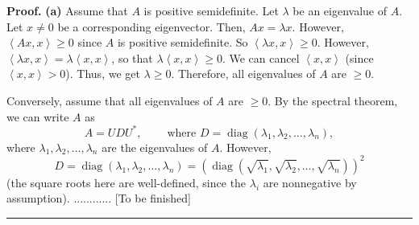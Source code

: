 \documentclass[numbers=enddot,12pt,final,onecolumn,notitlepage]{scrartcl}%
\numberwithin{exer}{subsection}
\theoremstyle{definition}
\newenvironment{proof}[1][Proof]{\noindent\textbf{#1.} }{\ \rule{0.5em}{0.5em}}
\begin{document}
\begin{proof}
\textbf{(a)} Assume that $A$ is positive semidefinite. Let $\lambda$ be an
eigenvalue of $A$. Let $x\neq0$ be a corresponding eigenvector. Then,
$Ax=\lambda x$. However, $\left\langle Ax,x\right\rangle \geq0$ since $A$ is
positive semidefinite. So $\left\langle \lambda x,x\right\rangle \geq0$.
However, $\left\langle \lambda x,x\right\rangle =\lambda\left\langle
x,x\right\rangle $, so that $\lambda\left\langle x,x\right\rangle \geq0$. We
can cancel $\left\langle x,x\right\rangle $ (since $\left\langle
x,x\right\rangle >0$). Thus, we get $\lambda\geq0$. Therefore, all eigenvalues
of $A$ are $\geq0$.

Conversely, assume that all eigenvalues of $A$ are $\geq0$. By the spectral
theorem, we can write $A$ as
\[
A=UDU^{\ast},\ \ \ \ \ \ \ \ \ \ \text{where }D=\operatorname*{diag}\left(
\lambda_{1},\lambda_{2},\ldots,\lambda_{n}\right)  ,
\]
where $\lambda_{1},\lambda_{2},\ldots,\lambda_{n}$ are the eigenvalues of $A$.
However,
\[
D=\operatorname*{diag}\left(  \lambda_{1},\lambda_{2},\ldots,\lambda
_{n}\right)  =\left(  \operatorname*{diag}\left(  \sqrt{\lambda_{1}}%
,\sqrt{\lambda_{2}},\ldots,\sqrt{\lambda_{n}}\right)  \right)  ^{2}%
\]
(the square roots here are well-defined, since the $\lambda_{i}$ are
nonnegative by assumption). ............ [To be finished]
\end{proof}
\end{document}
